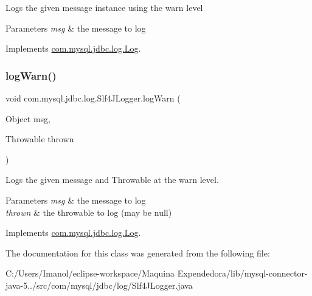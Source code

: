Logs the given message instance using the \textquotesingle{}warn\textquotesingle{} level


\begin{DoxyParams}{Parameters}
{\em msg} & the message to log \\
\hline
\end{DoxyParams}


Implements \mbox{\hyperlink{interfacecom_1_1mysql_1_1jdbc_1_1log_1_1_log_aa37a430b8cd7d66bb3ff46cb87e060f3}{com.\+mysql.\+jdbc.\+log.\+Log}}.

\mbox{\label{classcom_1_1mysql_1_1jdbc_1_1log_1_1_slf4_j_logger_a2588349587df84982b22529a87072bb8}} 
\subsubsection{\texorpdfstring{log\+Warn()}{logWarn()}\hspace{0.1cm}{\footnotesize\ttfamily [2/2]}}
{\footnotesize\ttfamily void com.\+mysql.\+jdbc.\+log.\+Slf4\+J\+Logger.\+log\+Warn (\begin{DoxyParamCaption}\item[{Object}]{msg,  }\item[{Throwable}]{thrown }\end{DoxyParamCaption})}

Logs the given message and Throwable at the \textquotesingle{}warn\textquotesingle{} level.


\begin{DoxyParams}{Parameters}
{\em msg} & the message to log \\
\hline
{\em thrown} & the throwable to log (may be null) \\
\hline
\end{DoxyParams}


Implements \mbox{\hyperlink{interfacecom_1_1mysql_1_1jdbc_1_1log_1_1_log_a04d875e95d9a1d35f305da5ca20219a3}{com.\+mysql.\+jdbc.\+log.\+Log}}.



The documentation for this class was generated from the following file\+:\begin{DoxyCompactItemize}
\item 
C\+:/\+Users/\+Imanol/eclipse-\/workspace/\+Maquina Expendedora/lib/mysql-\/connector-\/java-\/5../src/com/mysql/jdbc/log/Slf4\+J\+Logger.\+java\end{DoxyCompactItemize}
